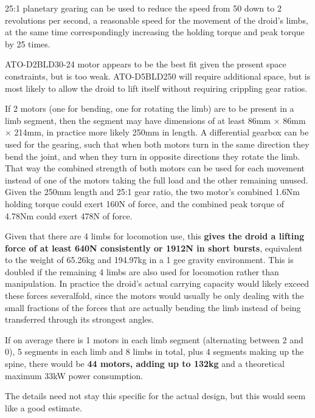 \documentclass[a4paper]{article}
\begin{document}
	25:1 planetary gearing can be used to reduce the speed from 50 down to 2 revolutions per second, a reasonable speed for the movement of the droid's limbs, at the same time correspondingly increasing the holding torque and peak torque by 25 times.
	
	\medskip
	
	ATO-D2BLD30-24 motor appears to be the best fit given the present space constraints, but is too weak.
	ATO-D5BLD250 will require additional space, but is most likely to allow the droid to lift itself without requiring crippling gear ratios.
	
	\medskip
	
	If 2 motors (one for bending, one for rotating the limb) are to be present in a limb segment, then the segment may have dimensions of at least 86mm × 86mm × 214mm, in practice more likely 250mm in length.
	A differential gearbox can be used for the gearing, such that when both motors turn in the same direction they bend the joint, and when they turn in opposite directions they rotate the limb.
	That way the combined strength of both motors can be used for each movement instead of one of the motors taking the full load and the other remaining unused.
	Given the 250mm length and 25:1 gear ratio, the two motor's combined 1.6Nm holding torque could exert 160N of force, and the combined peak torque of 4.78Nm could exert 478N of force.
	
	\medskip
	
	Given that there are 4 limbs for locomotion use, this \textbf{gives the droid a lifting force of at least 640N consistently or 1912N in short bursts}, equivalent to the weight of 65.26kg and 194.97kg in a 1 gee gravity environment.
	This is doubled if the remaining 4 limbs are also used for locomotion rather than manipulation.
	In practice the droid's actual carrying capacity would likely exceed these forces severalfold, since the motors would usually be only dealing with the small fractions of the forces that are actually bending the limb instead of being transferred through its strongest angles.
	
	\medskip
	
	If on average there is 1 motors in each limb segment (alternating between 2 and 0), 5 segments in each limb and 8 limbs in total, plus 4 segments making up the spine, there would be \textbf{44 motors, adding up to 132kg} and a theoretical maximum 33kW power consumption.
	
	\medskip
	
	The details need not stay this specific for the actual design, but this would seem like a good estimate.
	
\end{document}
